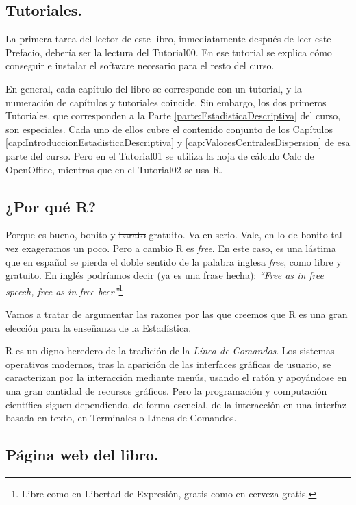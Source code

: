 \subsection*{Tutoriales.}
\label{prefacio:subsec:Tutoriales}

La primera tarea del lector de este libro, inmediatamente después de leer este Prefacio, debería ser la lectura del Tutorial00. En ese tutorial se explica cómo conseguir e instalar el software necesario para el resto del curso.


En general, cada capítulo del libro se corresponde con un tutorial, y la numeración de capítulos y tutoriales coincide. Sin embargo, los dos primeros Tutoriales, que corresponden a la Parte \ref{parte:EstadisticaDescriptiva} del curso, son especiales. Cada uno de ellos cubre el contenido conjunto de los Capítulos \ref{cap:IntroduccionEstadisticaDescriptiva} y \ref{cap:ValoresCentralesDispersion} de esa parte del curso. Pero en el Tutorial01 se utiliza la hoja de cálculo Calc de OpenOffice, mientras que en el Tutorial02 se usa R. 


\subsection*{¿Por qué R?}

Porque es bueno, bonito y \sout{barato} gratuito. Va en serio. Vale, en lo de bonito tal vez exageramos un poco. Pero a cambio R es {\em free}. En este caso, es una lástima que en español se pierda el doble sentido de la palabra inglesa {\em free}, como libre y gratuito. En inglés podríamos decir (ya es una frase hecha): {\em ``Free as in free speech, free as in free beer''}\footnote{Libre como en Libertad de Expresión, gratis como en cerveza gratis.}

Vamos a tratar de argumentar las razones por las que creemos que R es una gran elección para la enseñanza de la Estadística.

R es un digno heredero de la tradición de la {\em Línea de Comandos}. Los sistemas operativos modernos, tras la aparición de las interfaces gráficas de usuario, se caracterizan por la interacción mediante menús, usando el ratón y apoyándose en una gran cantidad de recursos gráficos. Pero la programación y computación científica siguen dependiendo, de forma esencial, de la interacción en una interfaz basada en texto, en Terminales o Líneas de Comandos.

\subsection*{Página web del libro.}
\label{prefacio:subsec:PaginaWebDelCurso}

